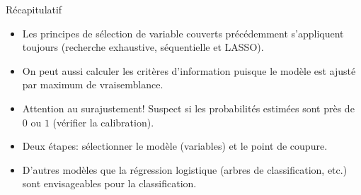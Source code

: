 \documentclass[
  ignorenonframetext,
]{beamer}
\providecommand{\tightlist}{%
  \setlength{\itemsep}{0pt}\setlength{\parskip}{0pt}}\usepackage{longtable,booktabs,array}
\begin{document}
\begin{frame}{Récapitulatif}
\label{ruxe9capitulatif-2}
\begin{itemize}
\tightlist
\item
  Les principes de sélection de variable couverts précédemment
  s'appliquent toujours (recherche exhaustive, séquentielle et LASSO).
\item
  On peut aussi calculer les critères d'information puisque le modèle
  est ajusté par maximum de vraisemblance.
\item
  Attention au surajustement! Suspect si les probabilités estimées sont
  près de \(0\) ou \(1\) (vérifier la calibration).
\item
  Deux étapes: sélectionner le modèle (variables) et le point de
  coupure.
\item
  D'autres modèles que la régression logistique (arbres de
  classification, etc.) sont envisageables pour la classification.
\end{itemize}
\end{frame}
\end{document}
